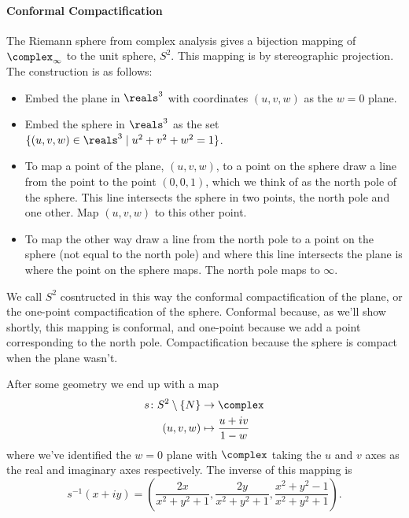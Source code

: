 \documentclass[fleqn]{NotesClass}
\begin{document}
    \paragraph{Conformal Compactification}
    The Riemann sphere from complex analysis gives a bijection mapping of \(\complex_{\infty}\) to the unit sphere, \(S^2\).
    This mapping is by stereographic projection.
    The construction is as follows:
    \begin{itemize}
        \item Embed the plane in \(\reals^3\) with coordinates \((u, v, w)\) as the \(w = 0\) plane.
        \item Embed the sphere in \(\reals^3\) as the set \(\{(u, v, w) \in \reals^3 \mid u^2 + v^2 + w^2 = 1\}\).
        \item To map a point of the plane, \((u, v, w)\), to a point on the sphere draw a line from the point to the point \((0, 0, 1)\), which we think of as the north pole of the sphere.
        This line intersects the sphere in two points, the north pole and one other.
        Map \((u, v, w)\) to this other point.
        \item To map the other way draw a line from the north pole to a point on the sphere (not equal to the north pole) and where this line intersects the plane is where the point on the sphere maps.
        The north pole maps to \(\infty\).
    \end{itemize}
    We call \(S^2\) cosntructed in this way the conformal compactification of the plane, or the one-point compactification of the sphere.
    Conformal because, as we'll show shortly, this mapping is conformal, and one-point because we add a point corresponding to the north pole.
    Compactification because the sphere is compact when the plane wasn't.
    
    After some geometry we end up with a map
    \begin{align}
        s \colon S^2 \setminus \{N\} &\to \complex\\
        (u, v, w) &\mapsto \frac{u + iv}{1 - w}
    \end{align}
    where we've identified the \(w = 0\) plane with \(\complex\) taking the \(u\) and \(v\) axes as the real and imaginary axes respectively.
    The inverse of this mapping is
    \begin{equation}
        s^{-1}(x + iy) = \left( \frac{2x}{x^2 + y^2 + 1}, \frac{2y}{x^2 + y^2 + 1}, \frac{x^2 + y^2 - 1}{x^2 + y^2 + 1} \right).
    \end{equation}
    
\end{document}
